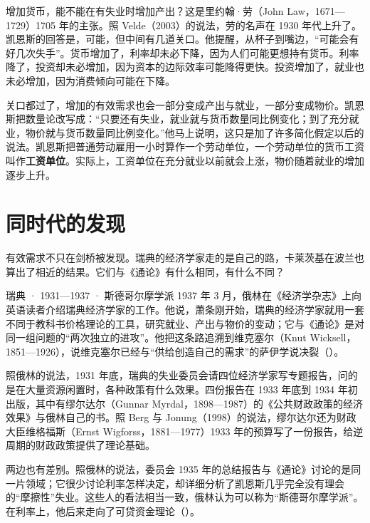 增加货币，能不能在有失业时增加产出？这是里约翰·劳（John Law，1671—1729）1705 年的主张\cite{law1705,loc32}。照 Velde（2003）的说法，劳的名声在 1930 年代上升了\cite{velde2003}。凯恩斯的回答是，可能，但中间有几道关口。他提醒，从杯子到嘴边，“可能会有好几次失手”\cite{keynes1936}。货币增加了，利率却未必下降，因为人们可能更想持有货币。利率降了，投资却未必增加，因为资本的边际效率可能降得更快。投资增加了，就业也未必增加，因为消费倾向可能在下降\cite{keynes1936}。

关口都过了，增加的有效需求也会一部分变成产出与就业，一部分变成物价。凯恩斯把数量论改写成：“只要还有失业，就业就与货币数量同比例变化；到了充分就业，物价就与货币数量同比例变化。”\cite{keynes1936}他马上说明，这只是加了许多简化假定以后的说法\cite{keynes1936}。凯恩斯把普通劳动雇用一小时算作一个劳动单位，一个劳动单位的货币工资叫作\textbf{工资单位}\cite{keynes1936}。实际上，工资单位在充分就业以前就会上涨，物价随着就业的增加逐步上升\cite{keynes1936}。

\section{同时代的发现}\label{sec:generaltheory-parallel}

有效需求不只在剑桥被发现。瑞典的经济学家走的是自己的路，卡莱茨基在波兰也算出了相近的结果。它们与《通论》有什么相同，有什么不同？

\begin{case}{瑞典 · 1931—1937 · 斯德哥尔摩学派}
1937 年 3 月，俄林在《经济学杂志》上向英语读者介绍瑞典经济学家的工作\cite{ohlin1937}。他说，萧条刚开始，瑞典的经济学家就用一套不同于教科书价格理论的工具，研究就业、产出与物价的变动；它与《通论》是对同一组问题的“两次独立的进攻”\cite{ohlin1937}。他把这条路追溯到维克塞尔（Knut Wicksell，1851—1926），说维克塞尔已经与“供给创造自己的需求”的萨伊学说决裂（）\cite{ohlin1937,loc32}。

照俄林的说法，1931 年底，瑞典的失业委员会请四位经济学家写专题报告，问的是在大量资源闲置时，各种政策有什么效果\cite{ohlin1937}。四份报告在 1933 年底到 1934 年初出版，其中有缪尔达尔（Gunnar Myrdal，1898—1987）的《公共财政政策的经济效果》与俄林自己的书\cite{ohlin1937,loc32}。照 Berg 与 Jonung（1998）的说法，缪尔达尔还为财政大臣维格福斯（Ernst Wigforss，1881—1977）1933 年的预算写了一份报告，给逆周期的财政政策提供了理论基础\cite{berg1998,loc32}。

两边也有差别。照俄林的说法，委员会 1935 年的总结报告与《通论》讨论的是同一片领域；它很少讨论利率怎样决定，却详细分析了凯恩斯几乎完全没有理会的“摩擦性”失业\cite{ohlin1937}。这些人的看法相当一致，俄林认为可以称为“斯德哥尔摩学派”\cite{ohlin1937}。在利率上，他后来走向了可贷资金理论（）。
\end{case}

